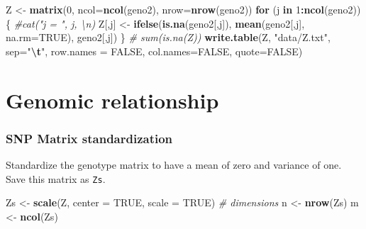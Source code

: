 \documentclass[
]{article}
\newenvironment{Shaded}{\begin{snugshade}}{\end{snugshade}}
\newcommand{\AttributeTok}[1]{\textcolor[rgb]{0.13,0.29,0.53}{#1}}
\newcommand{\CommentTok}[1]{\textcolor[rgb]{0.56,0.35,0.01}{\textit{#1}}}
\newcommand{\ConstantTok}[1]{\textcolor[rgb]{0.56,0.35,0.01}{#1}}
\newcommand{\ControlFlowTok}[1]{\textcolor[rgb]{0.13,0.29,0.53}{\textbf{#1}}}
\newcommand{\DecValTok}[1]{\textcolor[rgb]{0.00,0.00,0.81}{#1}}
\newcommand{\FunctionTok}[1]{\textcolor[rgb]{0.13,0.29,0.53}{\textbf{#1}}}
\newcommand{\NormalTok}[1]{#1}
\newcommand{\OtherTok}[1]{\textcolor[rgb]{0.56,0.35,0.01}{#1}}
\newcommand{\SpecialCharTok}[1]{\textcolor[rgb]{0.81,0.36,0.00}{\textbf{#1}}}
\newcommand{\StringTok}[1]{\textcolor[rgb]{0.31,0.60,0.02}{#1}}
\begin{document}
\begin{Shaded}
\begin{Highlighting}[]
\NormalTok{Z }\OtherTok{\textless{}{-}} \FunctionTok{matrix}\NormalTok{(}\DecValTok{0}\NormalTok{, }\AttributeTok{ncol=}\FunctionTok{ncol}\NormalTok{(geno2), }\AttributeTok{nrow=}\FunctionTok{nrow}\NormalTok{(geno2))}
\ControlFlowTok{for}\NormalTok{ (j }\ControlFlowTok{in} \DecValTok{1}\SpecialCharTok{:}\FunctionTok{ncol}\NormalTok{(geno2))\{}
  \CommentTok{\#cat("j = ", j, \textquotesingle{}\textbackslash{}n\textquotesingle{})}
\NormalTok{  Z[,j] }\OtherTok{\textless{}{-}} \FunctionTok{ifelse}\NormalTok{(}\FunctionTok{is.na}\NormalTok{(geno2[,j]), }\FunctionTok{mean}\NormalTok{(geno2[,j], }\AttributeTok{na.rm=}\ConstantTok{TRUE}\NormalTok{), geno2[,j])}
\NormalTok{\}}
\CommentTok{\# sum(is.na(Z))}
\FunctionTok{write.table}\NormalTok{(Z, }\StringTok{"data/Z.txt"}\NormalTok{, }\AttributeTok{sep=}\StringTok{"}\SpecialCharTok{\textbackslash{}t}\StringTok{"}\NormalTok{, }\AttributeTok{row.names =} \ConstantTok{FALSE}\NormalTok{, }
            \AttributeTok{col.names=}\ConstantTok{FALSE}\NormalTok{, }\AttributeTok{quote=}\ConstantTok{FALSE}\NormalTok{)}
\end{Highlighting}
\end{Shaded}

\section{Genomic relationship}\label{genomic-relationship}

\subsubsection{SNP Matrix
standardization}\label{snp-matrix-standardization}

Standardize the genotype matrix to have a mean of zero and variance of
one. Save this matrix as \texttt{Zs}.

\begin{Shaded}
\begin{Highlighting}[]
\NormalTok{Zs }\OtherTok{\textless{}{-}} \FunctionTok{scale}\NormalTok{(Z, }\AttributeTok{center =} \ConstantTok{TRUE}\NormalTok{, }\AttributeTok{scale =} \ConstantTok{TRUE}\NormalTok{)}
\CommentTok{\# dimensions }
\NormalTok{n }\OtherTok{\textless{}{-}} \FunctionTok{nrow}\NormalTok{(Zs)}
\NormalTok{m }\OtherTok{\textless{}{-}} \FunctionTok{ncol}\NormalTok{(Zs)}
\end{Highlighting}
\end{Shaded}
\end{document}
